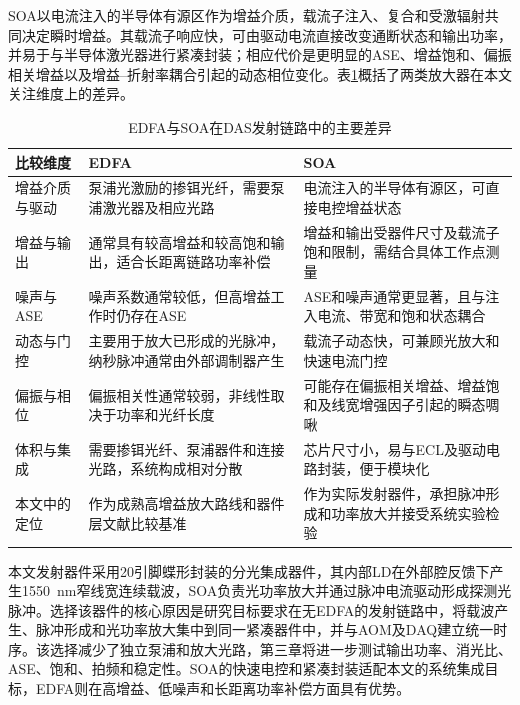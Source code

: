 SOA以电流注入的半导体有源区作为增益介质，载流子注入、复合和受激辐射共同决定瞬时增益。其载流子响应快，可由驱动电流直接改变通断状态和输出功率，并易于与半导体激光器进行紧凑封装；相应代价是更明显的ASE、增益饱和、偏振相关增益以及增益--折射率耦合引起的动态相位变化\cite{sobhanan2022soa}。表\ref{tab:edfa_soa_comparison}概括了两类放大器在本文关注维度上的差异。

\begin{table}[htbp]
  \centering
  \caption{EDFA与SOA在DAS发射链路中的主要差异}
  \label{tab:edfa_soa_comparison}
  \renewcommand{\arraystretch}{1.25}
  \begin{tabular}{p{}p{}p{}}
    \toprule
    比较维度 & EDFA & SOA \\
    \midrule
    增益介质与驱动 & 泵浦光激励的掺铒光纤，需要泵浦激光器及相应光路 & 电流注入的半导体有源区，可直接电控增益状态 \\
    增益与输出 & 通常具有较高增益和较高饱和输出，适合长距离链路功率补偿 & 增益和输出受器件尺寸及载流子饱和限制，需结合具体工作点测量 \\
    噪声与ASE & 噪声系数通常较低，但高增益工作时仍存在ASE & ASE和噪声通常更显著，且与注入电流、带宽和饱和状态耦合 \\
    动态与门控 & 主要用于放大已形成的光脉冲，纳秒脉冲通常由外部调制器产生 & 载流子动态快，可兼顾光放大和快速电流门控 \\
    偏振与相位 & 偏振相关性通常较弱，非线性取决于功率和光纤长度 & 可能存在偏振相关增益、增益饱和及线宽增强因子引起的瞬态啁啾 \\
    体积与集成 & 需要掺铒光纤、泵浦器件和连接光路，系统构成相对分散 & 芯片尺寸小，易与ECL及驱动电路封装，便于模块化 \\
    本文中的定位 & 作为成熟高增益放大路线和器件层文献比较基准 & 作为实际发射器件，承担脉冲形成和功率放大并接受系统实验检验 \\
    \bottomrule
  \end{tabular}
\end{table}

本文发射器件采用20引脚蝶形封装的分光集成器件，其内部LD在外部腔反馈下产生1550~nm窄线宽连续载波，SOA负责光功率放大并通过脉冲电流驱动形成探测光脉冲。选择该器件的核心原因是研究目标要求在无EDFA的发射链路中，将载波产生、脉冲形成和光功率放大集中到同一紧凑器件中，并与AOM及DAQ建立统一时序。该选择减少了独立泵浦和放大光路，第三章将进一步测试输出功率、消光比、ASE、饱和、拍频和稳定性。SOA的快速电控和紧凑封装适配本文的系统集成目标，EDFA则在高增益、低噪声和长距离功率补偿方面具有优势。


